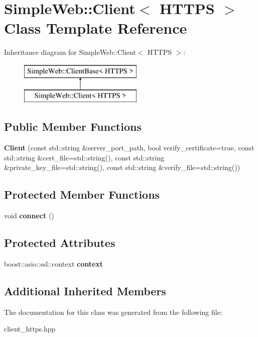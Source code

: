 \hypertarget{a01928}{}\section{Simple\+Web\+:\+:Client$<$ H\+T\+T\+PS $>$ Class Template Reference}
\label{a01928}
Inheritance diagram for Simple\+Web\+:\+:Client$<$ H\+T\+T\+PS $>$\+:\begin{figure}[H]
\begin{center}
\leavevmode
\includegraphics[height=2.000000cm]{a01928}
\end{center}
\end{figure}
\subsection*{Public Member Functions}
\begin{DoxyCompactItemize}
\item 
\mbox{\label{a01928_abd87d3dc08c9fed3a60f18c749b8bacd}} 
{\bfseries Client} (const std\+::string \&server\+\_\+port\+\_\+path, bool verify\+\_\+certificate=true, const std\+::string \&cert\+\_\+file=std\+::string(), const std\+::string \&private\+\_\+key\+\_\+file=std\+::string(), const std\+::string \&verify\+\_\+file=std\+::string())
\end{DoxyCompactItemize}
\subsection*{Protected Member Functions}
\begin{DoxyCompactItemize}
\item 
\mbox{\label{a01928_a833f6fd136e3158b873bee024d6e188c}} 
void {\bfseries connect} ()
\end{DoxyCompactItemize}
\subsection*{Protected Attributes}
\begin{DoxyCompactItemize}
\item 
\mbox{\label{a01928_afe57679cc6153d5d1fe8abc94a8fa58a}} 
boost\+::asio\+::ssl\+::context {\bfseries context}
\end{DoxyCompactItemize}
\subsection*{Additional Inherited Members}


The documentation for this class was generated from the following file\+:\begin{DoxyCompactItemize}
\item 
client\+\_\+https.\+hpp\end{DoxyCompactItemize}
